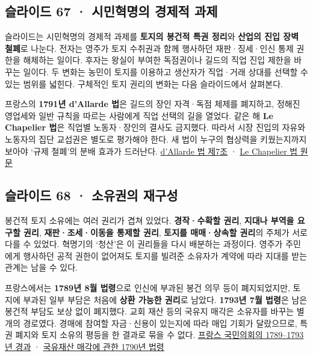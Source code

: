 \documentclass[10pt,a4paper]{article}
\begin{document}
\subsection{슬라이드 67 · 시민혁명의 경제적 과제}
슬라이드는 시민혁명의 경제적 과제를 \textbf{토지의 봉건적 특권 정리}와 \textbf{산업의 진입 장벽 철폐}로 나눈다. 전자는 영주가 토지 수취권과 함께 행사하던 재판·징세·인신 통제 권한을 해체하는 일이다. 후자는 왕실이 부여한 독점권이나 길드의 직업 진입 제한을 바꾸는 일이다. 두 변화는 농민이 토지를 이용하고 생산자가 직업·거래 상대를 선택할 수 있는 범위를 넓힌다. 구체적인 토지 권리의 변화는 다음 슬라이드에서 살펴본다.\par

프랑스의 \textbf{1791년 d’Allarde 법}은 길드의 장인 자격·독점 체제를 폐지하고, 정해진 영업세와 일반 규칙을 따르는 사람에게 직업 선택의 길을 열었다. 같은 해 \textbf{Le Chapelier 법}은 직업별 노동자·장인의 결사도 금지했다. 따라서 시장 진입의 자유와 노동자의 집단 교섭권은 별도로 평가해야 한다. 새 법이 누구의 협상력을 키웠는지까지 보아야 ‘규제 철폐’의 분배 효과가 드러난다. \href{https://www.legifrance.gouv.fr/codes/article\_lc/LEGIARTI000006501995/2026-05-12}{d’Allarde 법 제7조} · \href{https://www.legifrance.gouv.fr/loda/id/JORFTEXT000000704780/}{Le Chapelier 법 원문}\par

\subsection{슬라이드 68 · 소유권의 재구성}
봉건적 토지 소유에는 여러 권리가 겹쳐 있었다. \textbf{경작·수확할 권리}, \textbf{지대나 부역을 요구할 권리}, \textbf{재판·조세·이동을 통제할 권리}, \textbf{토지를 매매·상속할 권리}의 주체가 서로 다를 수 있었다. 혁명기의 ‘청산’은 이 권리들을 다시 배분하는 과정이다. 영주가 주민에게 행사하던 공적 권한이 없어져도 토지를 빌려준 소유자가 계약에 따라 지대를 받는 관계는 남을 수 있다.\par

프랑스에서는 \textbf{1789년 8월 법령}으로 인신에 부과된 봉건 의무 등이 폐지되었지만, 토지에 부과된 일부 부담은 처음에 \textbf{상환 가능한 권리}로 남았다. \textbf{1793년 7월 법령}은 남은 봉건적 부담도 보상 없이 폐지했다. 교회 재산 등의 국유지 매각은 소유자를 바꾸는 별개의 경로였다. 경매에 참여할 자금·신용이 있는지에 따라 매입 기회가 달랐으므로, 특권 폐지와 토지 소유의 평등을 한 결과로 묶을 수 없다. \href{https://www.assemblee-nationale.fr/dyn/histoire-et-patrimoine/revolution-francaise/nuit-du-4-aout-abolition-des-privileges}{프랑스 국민의회의 1789–1793년 경과} · \href{https://catalogue.bnf.fr/ark:/12148/cb33761287x}{국유재산 매각에 관한 1790년 법령}\par
\end{document}
